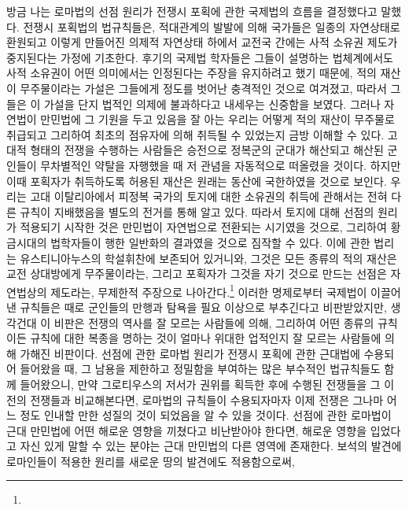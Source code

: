 방금 나는 로마법의 선점 원리가
전쟁시 포획에 관한 국제법의 흐름을 결정했다고 말했다.
전쟁시 포획법의 법규칙들은,
적대관계의 발발에 의해 국가들은 일종의 자연상태로 환원되고
이렇게 만들어진 의제적 자연상태 하에서
교전국 간에는
사적 소유권 제도가
중지된다는
가정에 기초한다.
후기의 국제법 학자들은
그들이 설명하는 법체계에서도
사적 소유권이 어떤 의미에서는 인정된다는 주장을
유지하려고 했기 때문에,
적의 재산이 무주물이라는 가설은 그들에게
정도를 벗어난 충격적인 것으로 여겨졌고,
따라서 그들은 이 가설을 단지 법적인 의제에 불과하다고
내세우는 신중함을 보였다.
그러나 자연법이 만민법에 그 기원을 두고 있음을 잘 아는 우리는
어떻게 적의 재산이 무주물로 취급되고 그리하여
최초의 점유자에 의해 취득될 수 있었는지 금방 이해할 수 있다.
고대적 형태의 전쟁을 수행하는 사람들은
승전으로 정복군의 군대가 해산되고
해산된 군인들이 무차별적인 약탈을 자행했을 때
저 관념을 자동적으로 떠올렸을 것이다.
하지만
이때 포획자가 취득하도록 허용된 재산은
원래는 동산에 국한하였을 것으로 보인다.
우리는
고대 이탈리아에서
피정복 국가의 토지에 대한 소유권의 취득에 관해서는
전혀 다른 규칙이 지배했음을 별도의 전거를 통해 알고 있다.
따라서 토지에 대해 선점의 원리가 적용되기 시작한 것은
만민법이 자연법으로 전환되는 시기였을 것으로,
그리하여 황금시대의 법학자들이 행한 일반화의 결과였을 것으로
짐작할 수 있다.
이에 관한 법리는 유스티니아누스의 학설휘찬에 보존되어 있거니와,
그것은 모든 종류의 적의 재산은 교전 상대방에게 무주물이라는,
그리고 포획자가 그것을 자기 것으로 만드는 선점은 자연법상의 제도라는,
무제한적 주장으로 나아간다.\footnote{%
  }
이러한 명제로부터 국제법이 이끌어낸 규칙들은
때로 군인들의 만행과 탐욕을 필요 이상으로 부추긴다고
비판받았지만,
생각건대 이 비판은
전쟁의 역사를 잘 모르는 사람들에 의해,
그리하여 어떤 종류의 규칙이든 규칙에 대한 복종을 명하는 것이
얼마나 위대한 업적인지 잘 모르는 사람들에 의해 가해진 비판이다.
선점에 관한 로마법 원리가 전쟁시 포획에 관한 근대법에 수용되어 들어왔을 때,
그 남용을 제한하고 정밀함을 부여하는
많은 부수적인 법규칙들도 함께 들어왔으니,
만약 그로티우스의 저서가 권위를 획득한 후에 수행된 전쟁들을
그 이전의 전쟁들과 비교해본다면,
로마법의 규칙들이 수용되자마자 이제 전쟁은 그나마 어느 정도
인내할 만한 성질의 것이 되었음을 알 수 있을 것이다.
선점에 관한 로마법이 근대 만민법에
어떤 해로운 영향을 끼쳤다고 비난받아야 한다면,
해로운 영향을 입었다고 자신 있게 말할 수 있는
분야는
근대 만민법의 다른 영역에 존재한다.
보석의 발견에 로마인들이 적용한 원리를 새로운 땅의 발견에도 적용함으로써,
